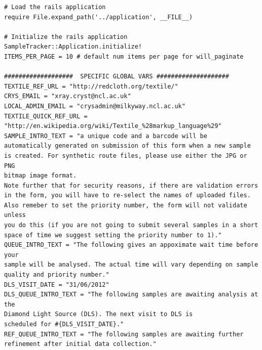 \documentclass[12pt,twoside]{article}
\begin{document}
\small
\begin{verbatim}
# Load the rails application
require File.expand_path('../application', __FILE__)

# Initialize the rails application
SampleTracker::Application.initialize!
ITEMS_PER_PAGE = 10 # default num items per page for will_paginate

###################  SPECIFIC GLOBAL VARS ####################
TEXTILE_REF_URL = "http://redcloth.org/textile/"
CRYS_EMAIL = "xray.cryst@ncl.ac.uk"
LOCAL_ADMIN_EMAIL = "crysadmin@milkyway.ncl.ac.uk"
TEXTILE_QUICK_REF_URL = "http://en.wikipedia.org/wiki/Textile_%28markup_language%29"
SAMPLE_INTRO_TEXT = "a unique code and a barcode will be
automatically generated on submission of this form when a new sample
is created. For synthetic route files, please use either the JPG or PNG
bitmap image format.
Note further that for security reasons, if there are validation errors
in the form, you will have to re-select the names of uploaded files.
Also remeber to set the priority number, the form will not validate unless
you do this (if you are not going to submit several samples in a short
space of time we suggest setting the priority number to 1)."
QUEUE_INTRO_TEXT = "The following gives an appoximate wait time before your 
sample will be analysed. The actual time will vary depending on sample 
quality and priority number."
DLS_VISIT_DATE = "31/06/2012"
DLS_QUEUE_INTRO_TEXT = "The following samples are awaiting analysis at the 
Diamond Light Source (DLS). The next visit to DLS is 
scheduled for #{DLS_VISIT_DATE}."
REF_QUEUE_INTRO_TEXT = "The following samples are awaiting further refinement after initial data collection."
\end{verbatim}
\normalsize
\end{document}
